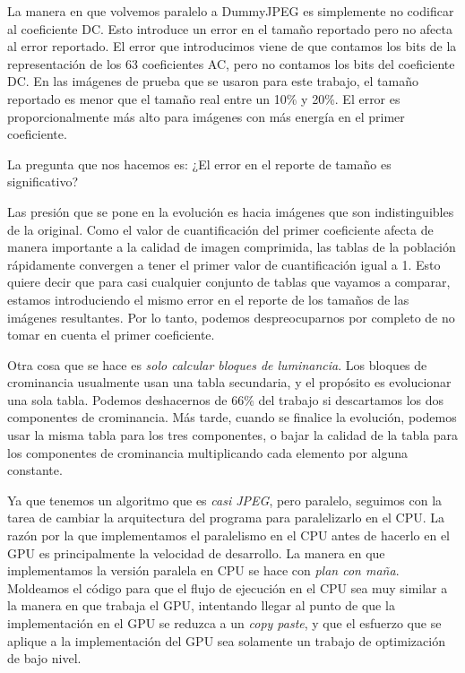 La manera en que volvemos paralelo a DummyJPEG es simplemente no codificar al
coeficiente DC. Esto introduce un error en el tamaño reportado pero no afecta
al error reportado. El error que introducimos viene de que contamos los bits de
la representación de los 63 coeficientes AC, pero no contamos los bits del
coeficiente DC. En las imágenes de prueba que se usaron para este trabajo, el
tamaño reportado es menor que el tamaño real entre un 10\% y 20\%. El error es
proporcionalmente más alto para imágenes con más energía en el primer
coeficiente.

La pregunta que nos hacemos es: ¿El error en el reporte de tamaño es
significativo?

Las presión que se pone en la evolución es hacia imágenes que son
indistinguibles de la original. Como el valor de cuantificación del primer
coeficiente afecta de manera importante a la calidad de imagen comprimida, las
tablas de la población rápidamente convergen a tener el primer valor de
cuantificación igual a 1. Esto quiere decir que para casi cualquier conjunto de
tablas que vayamos a comparar, estamos introduciendo el mismo error en el
reporte de los tamaños de las imágenes resultantes. Por lo tanto, podemos
despreocuparnos por completo de no tomar en cuenta el primer coeficiente.

Otra cosa que se hace es \emph{solo calcular bloques de luminancia}. Los
bloques de crominancia usualmente usan una tabla secundaria, y el propósito es
evolucionar una sola tabla. Podemos deshacernos de $66\%$ del trabajo si
descartamos los dos componentes de crominancia. Más tarde, cuando se finalice
la evolución, podemos usar la misma tabla para los tres componentes, o bajar la
calidad de la tabla para los componentes de crominancia multiplicando cada
elemento por alguna constante.

Ya que tenemos un algoritmo que es \emph{casi JPEG}, pero paralelo, seguimos
con la tarea de cambiar la arquitectura del programa para paralelizarlo en el
CPU. La razón por la que implementamos el paralelismo en el CPU antes de
hacerlo en el GPU es principalmente la velocidad de desarrollo. La manera en
que implementamos la versión paralela en CPU se hace con \emph{plan con maña}.
Moldeamos el código para que el flujo de ejecución en el CPU sea muy
similar a la manera en que trabaja el GPU, intentando llegar al punto de que la
implementación en el GPU se reduzca a un \emph{copy paste}, y que el esfuerzo
que se aplique a la implementación del GPU sea solamente un trabajo de
optimización de bajo nivel.

